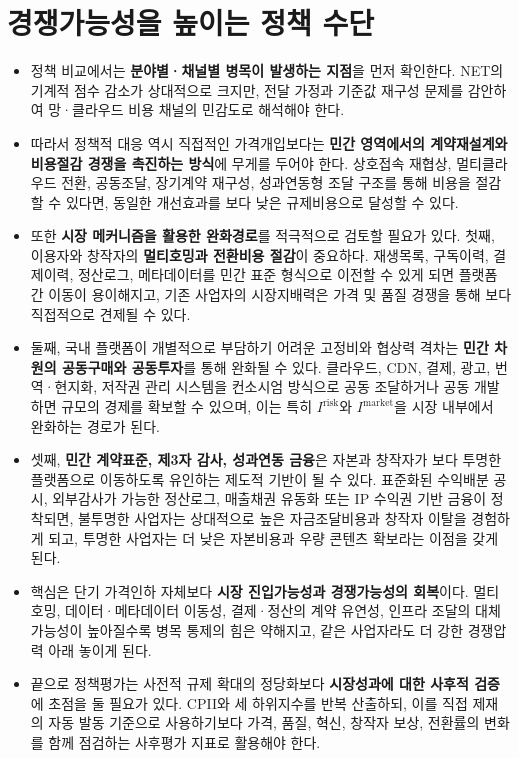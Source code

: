 \documentclass[11pt,a4paper]{report}
\begin{document}
\section{경쟁가능성을 높이는 정책 수단}
\begin{itemize}[leftmargin=1.8em,itemsep=0.35em]
  \item 정책 비교에서는 \textbf{분야별·채널별 병목이 발생하는 지점}을 먼저 확인한다. NET의 기계적 점수 감소가 상대적으로 크지만, 전달 가정과 기준값 재구성 문제를 감안하여 망·클라우드 비용 채널의 민감도로 해석해야 한다.
  \item 따라서 정책적 대응 역시 직접적인 가격개입보다는 \textbf{민간 영역에서의 계약재설계와 비용절감 경쟁을 촉진하는 방식}에 무게를 두어야 한다. 상호접속 재협상, 멀티클라우드 전환, 공동조달, 장기계약 재구성, 성과연동형 조달 구조를 통해 비용을 절감할 수 있다면, 동일한 개선효과를 보다 낮은 규제비용으로 달성할 수 있다.
  \item 또한 \textbf{시장 메커니즘을 활용한 완화경로}를 적극적으로 검토할 필요가 있다. 첫째, 이용자와 창작자의 \textbf{멀티호밍과 전환비용 절감}이 중요하다. 재생목록, 구독이력, 결제이력, 정산로그, 메타데이터를 민간 표준 형식으로 이전할 수 있게 되면 플랫폼 간 이동이 용이해지고, 기존 사업자의 시장지배력은 가격 및 품질 경쟁을 통해 보다 직접적으로 견제될 수 있다.
  \item 둘째, 국내 플랫폼이 개별적으로 부담하기 어려운 고정비와 협상력 격차는 \textbf{민간 차원의 공동구매와 공동투자}를 통해 완화될 수 있다. 클라우드, CDN, 결제, 광고, 번역·현지화, 저작권 관리 시스템을 컨소시엄 방식으로 공동 조달하거나 공동 개발하면 규모의 경제를 확보할 수 있으며, 이는 특히 \(I^{\mathrm{risk}}\)와 \(I^{\mathrm{market}}\)을 시장 내부에서 완화하는 경로가 된다.
  \item 셋째, \textbf{민간 계약표준, 제3자 감사, 성과연동 금융}은 자본과 창작자가 보다 투명한 플랫폼으로 이동하도록 유인하는 제도적 기반이 될 수 있다. 표준화된 수익배분 공시, 외부감사가 가능한 정산로그, 매출채권 유동화 또는 IP 수익권 기반 금융이 정착되면, 불투명한 사업자는 상대적으로 높은 자금조달비용과 창작자 이탈을 경험하게 되고, 투명한 사업자는 더 낮은 자본비용과 우량 콘텐츠 확보라는 이점을 갖게 된다.
  \item 핵심은 단기 가격인하 자체보다 \textbf{시장 진입가능성과 경쟁가능성의 회복}이다. 멀티호밍, 데이터·메타데이터 이동성, 결제·정산의 계약 유연성, 인프라 조달의 대체가능성이 높아질수록 병목 통제의 힘은 약해지고, 같은 사업자라도 더 강한 경쟁압력 아래 놓이게 된다.
  \item 끝으로 정책평가는 사전적 규제 확대의 정당화보다 \textbf{시장성과에 대한 사후적 검증}에 초점을 둘 필요가 있다. CPII와 세 하위지수를 반복 산출하되, 이를 직접 제재의 자동 발동 기준으로 사용하기보다 가격, 품질, 혁신, 창작자 보상, 전환률의 변화를 함께 점검하는 사후평가 지표로 활용해야 한다.
\end{itemize}
\end{document}

